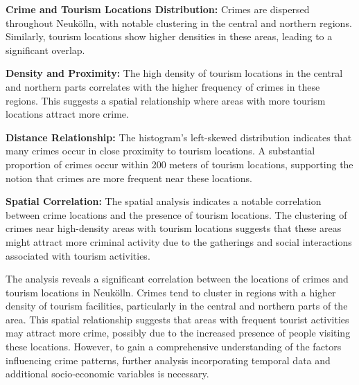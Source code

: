 \textbf{Crime and Tourism Locations Distribution:} Crimes are dispersed throughout Neukölln, with notable clustering in the central and northern regions. Similarly, tourism locations show higher densities in these areas, leading to a significant overlap. 

\textbf{Density and Proximity:} The high density of tourism locations in the central and northern parts correlates with the higher frequency of crimes in these regions. This suggests a spatial relationship where areas with more tourism locations attract more crime. 

\textbf{Distance Relationship:} The histogram's left-skewed distribution indicates that many crimes occur in close proximity to tourism locations. A substantial proportion of crimes occur within 200 meters of tourism locations, supporting the notion that crimes are more frequent near these locations. 

\textbf{Spatial Correlation:} The spatial analysis indicates a notable correlation between crime locations and the presence of tourism locations. The clustering of crimes near high-density areas with tourism locations suggests that these areas might attract more criminal activity due to the gatherings and social interactions associated with tourism activities. 

The analysis reveals a significant correlation between the locations of crimes and tourism locations in Neukölln. Crimes tend to cluster in regions with a higher density of tourism facilities, particularly in the central and northern parts of the area. This spatial relationship suggests that areas with frequent tourist activities may attract more crime, possibly due to the increased presence of people visiting these locations. However, to gain a comprehensive understanding of the factors influencing crime patterns, further analysis incorporating temporal data and additional socio-economic variables is necessary. 
